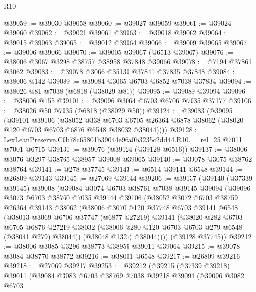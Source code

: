 \begin{lexlean}{R10}
\begin{coremodule}
@39059 := @39030 @39058
@39060 := @39027 @39059
@39061 := @39024 @39060
@39062 := @39021 @39061
@39063 := @39018 @39062
@39064 := @39015 @39063
@39065 := @39012 @39064
@39066 := @39009 @39065
@39067 := @39006 @39066
@39070 := @39005 @39067 (@6513 @39067)
@39076 := @38006 @3067 @3298 @38757 @38958 @37848 @39066
@39078 := @7194 @37861 @3062
@39083 := @39078 @3066 @35130 @37841 @37835 @37848
@39084 := @38006 @142
@39089 := @39084 @3065 @6703 @6852 @7038 @37834
@39094 := @38026 @81 @7038 (@6818 (@38029 @81))
@39095 := @39089 @39094
@39096 := @38006 @155
@39101 := @39096 @3064 @6703 @6706 @7035 @37177
@39106 := @38026 @50 @7035 (@6818 (@38029 @50))
@39124 := @39083
    (@39095
      (@39101
        @39106
        (@38052
          @338
          @6703
          @6705
          @26364
          @6878
          @38062
          (@38020 @120 @6703 @6703 @6876 @6548 @38032 @38044))))
@39128 := LexLeanPreserve.C0b78c65801b39044e96a0b3235c2dd44.R10.__rel_25 @7011 @7001 @6715
@39131 := @39076 (@39124 (@39128 @6516))
@39137 := @38006 @3076 @3297 @38765 @38957 @39008 @39065
@39140 := @39078 @3075 @38762 @38764
@39141 := @278 @37745
@39143 := @6514 @39141 @6548
@39144 := @26809 @39143
@39145 := @27069 @39144
@39206 := @39137
    (@39140
      (@37339 @39145)
      @39008
      (@39084
        @3074
        @6703
        @38761
        @7038
        @39145
        @39094
        (@39096
          @3073
          @6703
          @38760
          @7035
          @39144
          @39106
          (@38052
            @3072
            @6703
            @38759
            @26364
            @39143
            @38062
            (@38006
              @3070
              @120
              @37748
              @6703
              @39141
              @6548
              (@38013
                @3069
                @6706
                @37747
                (@6877 @27219)
                @39141
                (@38020
                  @282
                  @6703
                  @6705
                  @6876
                  @27219
                  @38032
                  (@38006 @280 @120 @6703 @6703 @279 @6548 (@38041 @279) @38044))
                (@38048 @132))
              @38044))))
      (@39128 @37745))
@39212 := @38006 @3085 @3296 @38773 @38956 @39011 @39064
@39215 := @39078 @3084 @38770 @38772
@39216 := @38001 @6548
@39217 := @26809 @39216
@39218 := @27069 @39217
@39253 := @39212
    (@39215
      (@37339 @39218)
      @39011
      (@39084
        @3083
        @6703
        @38769
        @7038
        @39218
        @39094
        (@39096
          @3082
          @6703

\end{coremodule}
\end{lexlean}
